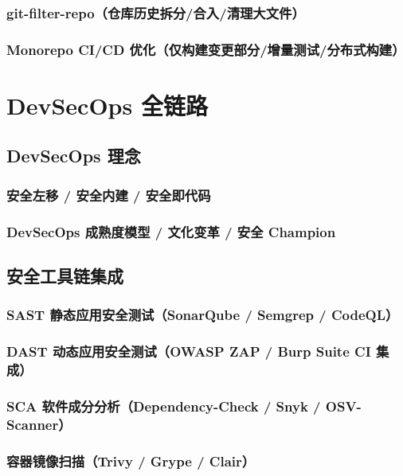 \documentclass[12pt,UTF8]{ctexbook}
\begin{document}
    \subsection{git-filter-repo（仓库历史拆分/合入/清理大文件）}
    \subsection{Monorepo CI/CD 优化（仅构建变更部分/增量测试/分布式构建）}


\chapter{DevSecOps 全链路}
\label{chap:devsecops-full}

  \section{DevSecOps 理念}
    \subsection{安全左移 / 安全内建 / 安全即代码}
    \subsection{DevSecOps 成熟度模型 / 文化变革 / 安全 Champion}

  \section{安全工具链集成}
    \subsection{SAST 静态应用安全测试（SonarQube / Semgrep / CodeQL）}
    \subsection{DAST 动态应用安全测试（OWASP ZAP / Burp Suite CI 集成）}
    \subsection{SCA 软件成分分析（Dependency-Check / Snyk / OSV-Scanner）}
    \subsection{容器镜像扫描（Trivy / Grype / Clair）}
\end{document}
